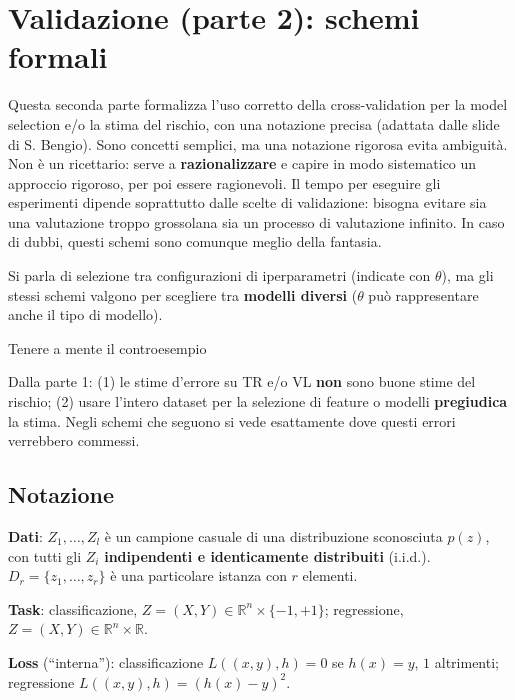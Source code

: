 \chapter{Validazione (parte 2): schemi formali}\label{ch-10}

Questa seconda parte formalizza l'uso corretto della cross-validation
per la model selection e/o la stima del rischio, con una notazione
precisa (adattata dalle slide di S. Bengio). Sono concetti semplici, ma
una notazione rigorosa evita ambiguità. Non è un ricettario: serve a
\textbf{razionalizzare} e capire in modo sistematico un approccio
rigoroso, per poi essere ragionevoli. Il tempo per eseguire gli
esperimenti dipende soprattutto dalle scelte di validazione: bisogna
evitare sia una valutazione troppo grossolana sia un processo di
valutazione infinito. In caso di dubbi, questi schemi sono comunque
meglio della fantasia.

Si parla di selezione tra configurazioni di iperparametri (indicate con
\(\theta\)), ma gli stessi schemi valgono per scegliere tra
\textbf{modelli diversi} (\(\theta\) può rappresentare anche il tipo di
modello).

\begin{boxtip}{Tenere a mente il controesempio}

Dalla parte 1: (1) le stime d'errore su TR e/o VL \textbf{non} sono
buone stime del rischio; (2) usare l'intero dataset per la selezione di
feature o modelli \textbf{pregiudica} la stima. Negli schemi che seguono
si vede esattamente dove questi errori verrebbero commessi.

\end{boxtip}

\section{Notazione}\label{notazione}

\textbf{Dati}: \(Z_1, \dots, Z_l\) è un campione casuale di una
distribuzione sconosciuta \(p(z)\), con tutti gli \(Z_i\)
\textbf{indipendenti e identicamente distribuiti} (i.i.d.).
\(D_r = \{z_1, \dots, z_r\}\) è una particolare istanza con \(r\)
elementi.

\textbf{Task}: classificazione,
\(Z = (X, Y) \in \mathbb{R}^n \times \{-1, +1\}\); regressione,
\(Z = (X, Y) \in \mathbb{R}^n \times \mathbb{R}\).

\textbf{Loss} (``interna''): classificazione \(L((x,y), h) = 0\) se
\(h(x) = y\), \(1\) altrimenti; regressione
\(L((x,y), h) = (h(x) - y)^2\).

